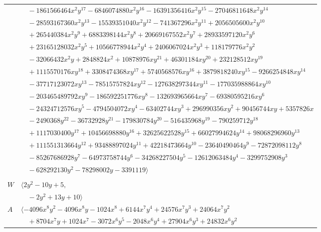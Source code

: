 \documentclass[11pt]{article}
\begin{document}
\begin{longtable}{@{}ll@{}}
 & $\quad -1861566464x^{2}y^{17}-6846074880x^{2}y^{16}-16391356416x^{2}y^{15}-27046811648x^{2}y^{14}$\\
 & $\quad -28593167360x^{2}y^{13}-15539351040x^{2}y^{12}-741367296x^{2}y^{11}+2056505600x^{2}y^{10}$\\
 & $\quad +265440384x^{2}y^{9}+6883398144x^{2}y^{8}+20669167552x^{2}y^{7}+28933597120x^{2}y^{6}$\\
 & $\quad +23165128032x^{2}y^{5}+10566778944x^{2}y^{4}+2406067024x^{2}y^{3}+118179776x^{2}y^{2}$\\
 & $\quad -32066432x^{2}y+2848824x^{2}+10878976xy^{21}+46301184xy^{20}+232128512xy^{19}$\\
 & $\quad +1115570176xy^{18}+3308474368xy^{17}+5740568576xy^{16}+3879818240xy^{15}-9266254848xy^{14}$\\
 & $\quad -37717123072xy^{13}-78515757824xy^{12}-127638297344xy^{11}-177035988864xy^{10}$\\
 & $\quad -203465489792xy^{9}-186592251776xy^{8}-132693965664xy^{7}-69380595216xy^{6}$\\
 & $\quad -24324712576xy^{5}-4794504072xy^{4}-63402744xy^{3}+296990356xy^{2}+90456744xy+5357826x$\\
 & $\quad -2490368y^{22}-36732928y^{21}-179830784y^{20}-516435968y^{19}-790259712y^{18}$\\
 & $\quad +1117030400y^{17}+10456698880y^{16}+32625622528y^{15}+66027994624y^{14}+98068296960y^{13}$\\
 & $\quad +111551313664y^{12}+93488897024y^{11}+42218473664y^{10}-23640490464y^{9}-72872098112y^{8}$\\
 & $\quad -85267686928y^{7}-64973758744y^{6}-34268227504y^{5}-12612063484y^{4}-3299752908y^{3}$\\
 & $\quad -628292130y^{2}-78298002y-3391119\rangle$\\
\addlinespace[2pt]
\multicolumn{2}{@{}p{0.97\textwidth}@{}}{$i=46$, $D_i=8$, $\rho_{ij}$: $2{:}1, \allowbreak 12{:}2, \allowbreak 19{:}2, \allowbreak 29{:}1, \allowbreak 30{:}2, \allowbreak 38{:}1, \allowbreak 40{:}2, \allowbreak 53{:}1, \allowbreak 63{:}1$}\\
$W$ & $\langle 2y^{2}-10y+5,$\\
 & $\quad -2y^{2}+13y+10\rangle$\\
$A$ & $\langle -4096x^{8}y^{2}-4096x^{8}y-1024x^{8}+6144x^{7}y^{4}+24576x^{7}y^{3}+24064x^{7}y^{2}$\\
 & $\quad +8704x^{7}y+1024x^{7}-3072x^{6}y^{5}-2048x^{6}y^{4}+27904x^{6}y^{3}+24832x^{6}y^{2}$\\

\end{longtable}
\end{document}

